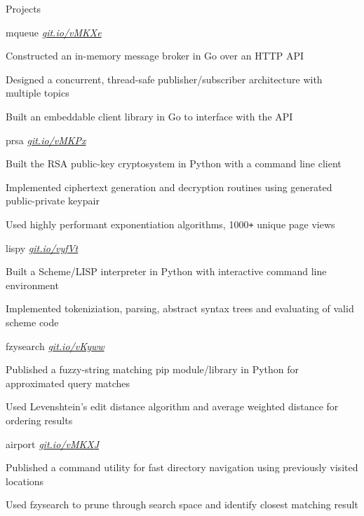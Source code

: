 \documentclass{resume} %
\begin{document}
\begin{rSection}{Projects}
  \begin{rSubsection}{mqueue}
	  {\em {\href{http://github.com/ridwanmsharif/mqueue}
		    {git.io/vMKXe}}}
	  {}

	  \item Constructed an in-memory message broker in Go
			  over an HTTP API
	  \item Designed a concurrent, thread-safe publisher/subscriber
		  architecture with multiple topics
      \item Built an embeddable client library in Go to interface with the API
        
  \end{rSubsection}

  \begin{rSubsection}{prsa}
	  {\em {\href{http://github.com/ridwanmsharif/prsa}
		    {git.io/vMKPx}}}
	  {}

	  \item Built the RSA public-key cryptosystem in Python with a
			  command line client
	  \item Implemented ciphertext generation and decryption routines using
		  generated public-private keypair
	  \item Used highly performant exponentiation algorithms,
		  1000\texttt{+} unique page views
  \end{rSubsection}

  \begin{rSubsection}{lispy}
	  {\em {\href{http://github.com/ridwanmsharif/lispy}
		    {git.io/vyfVt}}}
	  {}

	  \item Built a Scheme/LISP interpreter in Python with interactive command line environment
	  \item Implemented tokeniziation, parsing, abstract syntax trees and evaluating of valid scheme code
  \end{rSubsection}

  \begin{rSubsection}{fzysearch}
	  {\em{ \href{http://github.com/ridwanmsharif/fzysearch}
		    {git.io/vKyww}}}
	  {}

	 \item Published a fuzzy-string matching pip module/library in
		 Python for approximated query matches
	\item Used Levenshtein's edit distance algorithm and average
		weighted distance for ordering results
  \end{rSubsection}
  
  \begin{rSubsection}{airport}
	  {\em{ \href{http://github.com/ridwanmsharif/airport}
		    {git.io/vMKXJ}}}
	  {}

	\item Published a command utility for fast directory navigation using
		previously visited locations
	\item Used fzysearch to prune through search space and identify closest
		matching result
  \end{rSubsection}
\end{rSection}
\end{document}
